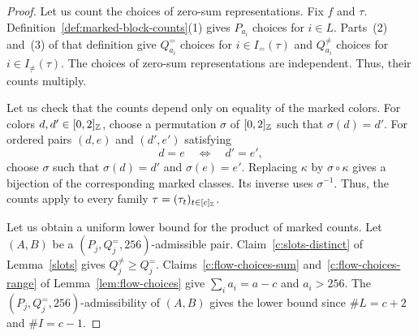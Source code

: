 \begin{proof}
 Let us count the choices of zero-sum representations. Fix $f$ and $\tau$.
Definition~\ref{def:marked-block-counts}(1) gives $P_{a_i}$ choices for $i\in L$.
Parts~(2) and~(3) of that definition give $Q_{a_i}^{=}$ choices for $i\in I_=(\tau)$
and $Q_{a_i}^{\ne}$ choices for $i\in I_{\ne}(\tau)$.
The choices of zero-sum representations are independent. Thus, their counts multiply.

Let us check that the counts depend only on equality of the marked colors.
For colors $d,d'\in[0,2]_{\mathbb Z}$, choose a permutation $\sigma$ of $[0,2]_{\mathbb Z}$ such that $\sigma(d)=d'$.
For ordered pairs $(d,e)$ and $(d',e')$ satisfying
\[
 d=e\quad\Longleftrightarrow\quad d'=e',
\]
choose $\sigma$ such that $\sigma(d)=d'$ and $\sigma(e)=e'$.
Replacing $\kappa$ by $\sigma\circ\kappa$ gives a bijection of the corresponding marked classes.
Its inverse uses $\sigma^{-1}$. Thus, the counts apply to every family $\tau=(\tau_t)_{t\in[c]_{\mathbb Z}}$.

Let us obtain a uniform lower bound for the product of marked counts.
Let $(A,B)$ be a $(P_j,Q_j^{=},256)$-admissible pair.
Claim~\ref{c:slots-distinct} of Lemma~\ref{slots} gives $Q_j^{\ne}\ge Q_j^=$.
Claims~\ref{c:flow-choices-sum} and~\ref{c:flow-choices-range} of Lemma~\ref{lem:flow-choices}
give $\sum_i a_i=a-c$ and $a_i>256$.
The $(P_j,Q_j^{=},256)$-admissibility of $(A,B)$ gives the lower bound since $\#L=c+2$ and $\#I=c-1$.
\end{proof}

